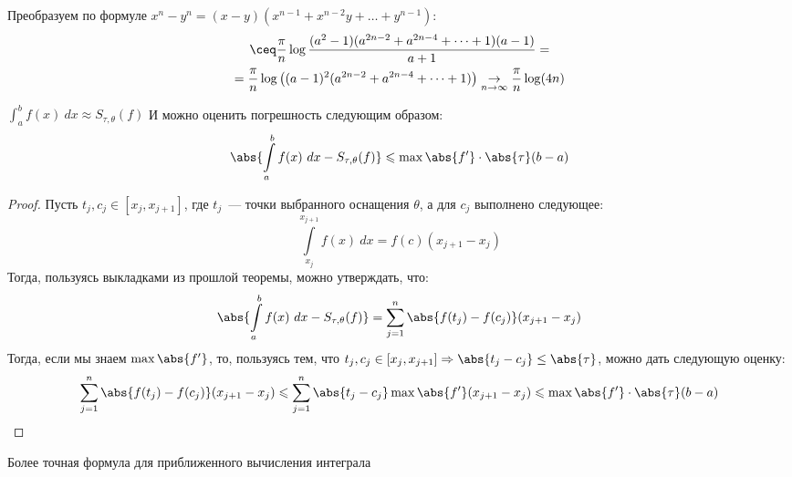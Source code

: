 \begin{example}
\begin{enumerate}
\begin{itemize}
\[            \] 
            Преобразуем по формуле $x^n - y^n = (x - y)(x^{n - 1} + x^{n - 2}y + \dots + y^{n - 1})$:
            \[
                \begin{gathered}
                    \ceq \frac{\pi}{n}\log\frac{(a^2-1)(a^{2n - 2}+a^{2n - 4} + \dots + 1)(a-1)}{a+1}=\\=
                    \frac{\pi}{n}\log\left((a-1)^2(a^{2n - 2}+a^{2n - 4} + \dots + 1)\right)
                    \underset{n\to\infty}{\to} \frac{\pi}{n}\log(4n)
                \end{gathered}
            \] 
    \end{itemize}
    \end{enumerate}
    
\end{example}


\begin{remark}
    $\int_a^b f(x)\ dx \approx S_{\tau, \theta}(f)$
    И можно оценить погрешность следующим образом:
     \[
        \abs{\int\limits_{a}^{b}{f(x)\ dx} - S_{\tau, \theta}(f)} \leqslant \max{\abs{f'}} \cdot \abs{\tau} (b - a) 
    \] 
\end{remark}
\begin{proof}
    Пусть $t_j, c_j \in [x_j, x_{j + 1}]$, где $t_j$~--- точки выбранного оснащения $\theta$, а для $c_j$ выполнено следующее:
    \[
        \int\limits_{x_j}^{x_{j + 1}}{f(x)\ dx} = f(c) (x_{j + 1} - x_j)
    \]
    Тогда, пользуясь выкладками из прошлой теоремы, можно утверждать, что:
     \[
        \abs{\int\limits_{a}^{b}{f(x)\ dx} - S_{\tau, \theta}(f)} =
        \sum\limits_{j = 1}^{n} \abs{f(t_j) - f(c_j)}(x_{j + 1} - x_j) 
    \] 
    Тогда, если мы знаем $\max{\abs{f'}}$, то, пользуясь тем, что $t_j, c_j \in [x_j, x_{j + 1}] \Rightarrow \abs{t_j - c_j} \le \abs{\tau}$,
    можно дать следующую оценку:
    \[
        \begin{gathered}
            \sum\limits_{j = 1}^{n} \abs{f(t_j) - f(c_j)}(x_{j + 1} - x_j) \leqslant 
            \sum\limits_{j = 1}^{n} \abs{t_j - c_j} \max{\abs{f'}}(x_{j + 1} - x_j) \leqslant 
            \max{\abs{f'}} \cdot \abs{\tau} (b - a) 
        \end{gathered}
    \]
\end{proof} 
\quad 

\begin{remark}
    Более точная формула для приближенного вычисления интеграла
\end{remark}


 
